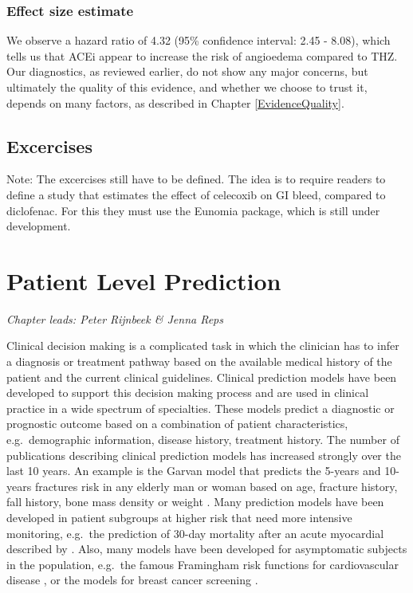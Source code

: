 \documentclass[]{book}
\begin{document}
\subsection{Effect size estimate}\label{effect-size-estimate}

We observe a hazard ratio of 4.32 (95\% confidence interval: 2.45 -
8.08), which tells us that ACEi appear to increase the risk of
angioedema compared to THZ. Our diagnostics, as reviewed earlier, do not
show any major concerns, but ultimately the quality of this evidence,
and whether we choose to trust it, depends on many factors, as described
in Chapter \ref{EvidenceQuality}.

\section{Excercises}\label{excercises}

Note: The excercises still have to be defined. The idea is to require
readers to define a study that estimates the effect of celecoxib on GI
bleed, compared to diclofenac. For this they must use the Eunomia
package, which is still under development.

\chapter{Patient Level Prediction}\label{PatientLevelPrediction}

\emph{Chapter leads: Peter Rijnbeek \& Jenna Reps}

Clinical decision making is a complicated task in which the clinician
has to infer a diagnosis or treatment pathway based on the available
medical history of the patient and the current clinical guidelines.
Clinical prediction models have been developed to support this decision
making process and are used in clinical practice in a wide spectrum of
specialties. These models predict a diagnostic or prognostic outcome
based on a combination of patient characteristics, e.g.~demographic
information, disease history, treatment history. The number of
publications describing clinical prediction models has increased
strongly over the last 10 years. An example is the Garvan model that
predicts the 5-years and 10-years fractures risk in any elderly man or
woman based on age, fracture history, fall history, bone mass density or
weight \citep{nguyen2008}. Many prediction models have been developed in
patient subgroups at higher risk that need more intensive monitoring,
e.g.~the prediction of 30-day mortality after an acute myocardial
described by \citet{lee1995}. Also, many models have been developed for
asymptomatic subjects in the population, e.g.~the famous Framingham risk
functions for cardiovascular disease \citep{wilson1998}, or the models
for breast cancer screening \citep{engel2015}.
\end{document}
